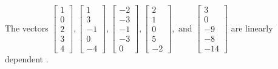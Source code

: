 \begin{exercise}
\begin{exerciseStatement}
  \end{exerciseStatement}
  \begin{exerciseAnswer}
   The vectors \(\left[\begin{array}{r}
1 \\
0 \\
2 \\
3 \\
4
\end{array}\right] , \left[\begin{array}{r}
1 \\
3 \\
-1 \\
0 \\
-4
\end{array}\right] , \left[\begin{array}{r}
-2 \\
-3 \\
-1 \\
-3 \\
0
\end{array}\right] , \left[\begin{array}{r}
2 \\
1 \\
0 \\
5 \\
-2
\end{array}\right] , \text{ and } \left[\begin{array}{r}
3 \\
0 \\
-9 \\
-8 \\
-14
\end{array}\right]\) are 
  	 linearly dependent  .
  


  \end{exerciseAnswer}
\end{exercise}